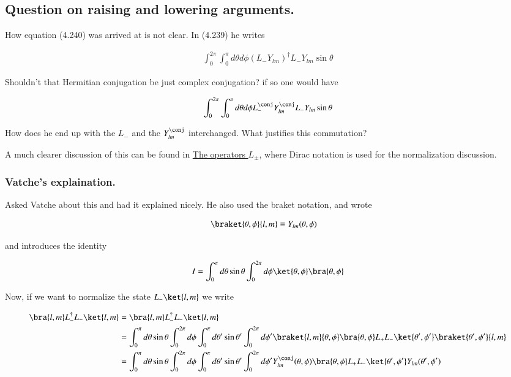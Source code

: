 \subsection{Question on raising and lowering arguments.}

How equation (4.240) was arrived at is not clear.  In (4.239) he writes

\begin{align*}
\int_0^{2\pi} \int_0^{\pi} d\theta d\phi
(L_{-} Y_{lm})^\dagger
L_{-} Y_{lm} \sin\theta
\end{align*}

Shouldn't that Hermitian conjugation be just complex conjugation? if so one would have

\begin{align*}
\int_0^{2\pi} \int_0^{\pi} d\theta d\phi
L_{-}^\conj Y_{lm}^\conj
L_{-} Y_{lm} \sin\theta
\end{align*}

How does he end up with the $L_{-}$ and the $Y_{lm}^\conj$ interchanged.  What justifies this commutation?

A much clearer discussion of this can be found in \href{http://quantummechanics.ucsd.edu/ph130a/130_notes/node217.html}{The operators $L_{\pm}$}, where Dirac notation is used for the normalization discussion.

\subsubsection{Vatche's explaination.}

Asked Vatche about this and had it explained nicely.  He also used the braket notation, and wrote

\begin{align}\label{eqn:desaiCh4:1000}
\braket{\theta,\phi}{l,m} &\equiv Y_{lm}(\theta,\phi)
\end{align}

and introduces the identity

\begin{align}\label{eqn:desaiCh4:1001}
I = \int_{0}^\pi d\theta \sin\theta \int_0^{2\pi} d\phi \ket{\theta,\phi}\bra{\theta,\phi}
\end{align}

Now, if we want to normalize the state $L_{-} \ket{l,m}$ we write

\begin{align*}
\bra{l,m} L_{-}^\dagger L_{-} \ket{l,m}
&=
\bra{l,m} L_{-}^\dagger L_{-} \ket{l,m} \\
&=
\int_{0}^\pi d\theta \sin\theta \int_0^{2\pi} d\phi 
\int_{0}^\pi d\theta' \sin\theta' \int_0^{2\pi} d\phi' 
\braket{l,m}{\theta,\phi}\bra{\theta,\phi}
L_{+} L_{-} 
\ket{\theta',\phi'}\braket{\theta',\phi'}{l,m} \\
&=
\int_{0}^\pi d\theta \sin\theta \int_0^{2\pi} d\phi 
\int_{0}^\pi d\theta' \sin\theta' \int_0^{2\pi} d\phi' 
Y_{lm}^\conj(\theta, \phi)
\bra{\theta,\phi} L_{+} L_{-} \ket{\theta',\phi'}
Y_{lm}(\theta', \phi')
\end{align*}

